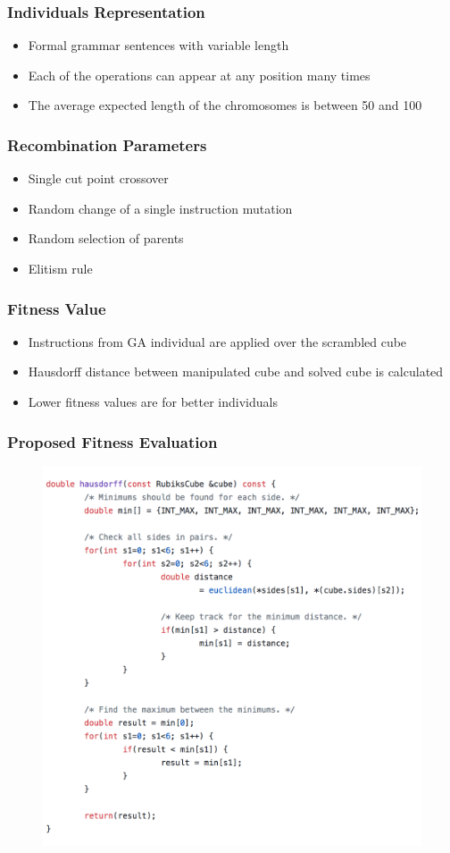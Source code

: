 \documentclass{beamer}
\begin{document}
\begin{frame}
\frametitle{Individuals Representation}
\begin{itemize}
  \item Formal grammar sentences with variable length
  \item Each of the operations can appear at any position many times
  \item The average expected length of the chromosomes is between 50 and 100
\end{itemize}
\end{frame}

\begin{frame}
\frametitle{Recombination Parameters}
\begin{itemize}
  \item Single cut point crossover
  \item Random change of a single instruction mutation
  \item Random selection of parents
  \item Elitism rule
\end{itemize}
\end{frame}

\begin{frame}
\frametitle{Fitness Value}
\begin{itemize}
  \item Instructions from GA individual are applied over the scrambled cube
  \item Hausdorff distance between manipulated cube and solved cube is calculated
  \item Lower fitness values are for better individuals
\end{itemize}
\end{frame}

\begin{frame}
\frametitle{Proposed Fitness Evaluation}
\begin{figure}[h]
  \centering
  \includegraphics[width=1.0\textwidth,height=0.65\textwidth]{fig01}
  \label{fig01}
\end{figure}
\end{frame}
\end{document}
